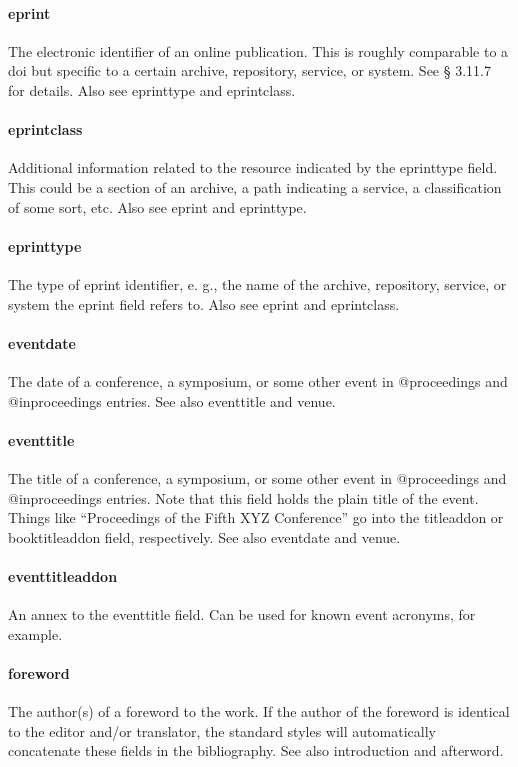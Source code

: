 \documentclass[a4paper,12pt]{report}
\begin{document}
\paragraph{eprint}
The electronic identifier of an online publication. This is roughly comparable to a doi but
specific to a certain archive, repository, service, or system. See § 3.11.7 for details. Also see
eprinttype and eprintclass.

\paragraph{eprintclass}
Additional information related to the resource indicated by the eprinttype field. This
could be a section of an archive, a path indicating a service, a classification of some sort,
etc. Also see eprint and eprinttype.

\paragraph{eprinttype}
The type of eprint identifier, e. g., the name of the archive, repository, service, or system
the eprint field refers to. Also see eprint and eprintclass.

\paragraph{eventdate}
The date of a conference, a symposium, or some other event in @proceedings and
@inproceedings entries. See also eventtitle and venue.

\paragraph{eventtitle}
The title of a conference, a symposium, or some other event in @proceedings and
@inproceedings entries. Note that this field holds the plain title of the event. Things like “Proceedings of the Fifth
XYZ Conference” go into the titleaddon or booktitleaddon field, respectively. See also
eventdate and venue.

\paragraph{eventtitleaddon}
An annex to the eventtitle field. Can be used for known event acronyms, for example.

\paragraph{foreword}
The author(s) of a foreword to the work. If the author of the foreword is identical to the
editor and/or translator, the standard styles will automatically concatenate these fields
in the bibliography. See also introduction and afterword.
\end{document}
